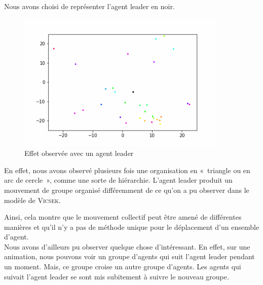 \documentclass[french, a4paper, 12pt, openany]{report}
\begin{document}
   Nous avons choisi de représenter l'agent leader en noir.
   \begin{figure}[!h]
		\centering
		\includegraphics[width=10cm]{images/image_15.png}
		\caption{Effet observée avec un agent leader}
		\label{leader}
	\end{figure}  
	
	   En effet, nous avons observé plusieurs fois une organisation en «~triangle ou en arc de cercle~», comme une sorte de hiérarchie. L'agent leader produit un mouvement de groupe organisé différemment de ce qu'on a pu observer dans le modèle de \textsc{Vicsek}.
	   
	   Ainsi, cela montre que le mouvement collectif peut être amené de différentes manières et qu'il n'y a pas de méthode unique pour le déplacement d'un ensemble d'agent.\\
    
  
       Nous avons d'ailleurs pu observer quelque chose d'intéressant. En effet, sur une animation, nous pouvons voir un groupe d'agents qui suit l'agent leader pendant un moment. Mais, ce groupe croise un autre groupe d'agents. Les agents qui suivait l'agent leader se sont mis subitement à suivre le nouveau groupe. 
       
\end{document}
